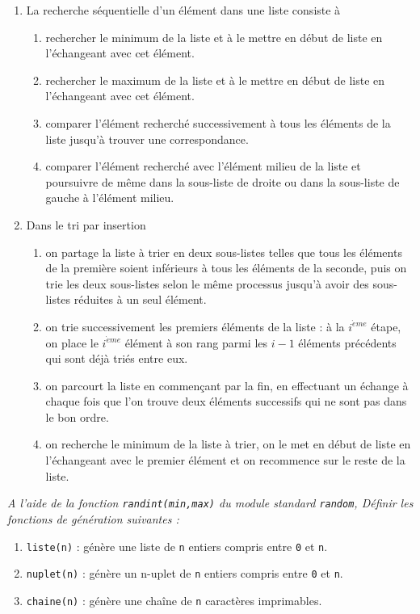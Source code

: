 \begin{td}[QCM (4)]
\begin{enumerate}
\item La recherche séquentielle d'un élément dans une liste consiste à 
	\begin{enumerate}
	\item rechercher le minimum de la liste et à le mettre en début de liste 
		en l'échangeant avec cet élément.
	\item rechercher le maximum de la liste et à le mettre en début de liste 
		en l'échangeant avec cet élément.
	\item comparer l'élément recherché successivement à tous les 
		éléments de la liste jusqu'à trouver une correspondance.
	\item comparer l'élément recherché avec l'élément milieu de la liste
		et poursuivre de même dans la sous-liste de droite ou 
		dans la sous-liste de gauche à l'élément milieu.
	\end{enumerate}

\item Dans le tri par insertion 
	\begin{enumerate}
	\item on partage la liste à trier en deux sous-listes telles que tous les éléments 
		de la première soient inférieurs à tous les éléments de la seconde,
		puis on trie les deux sous-listes selon le même processus jusqu'à 
		avoir des sous-listes réduites à un seul élément.
	\item on trie successivement les premiers éléments de la liste : à la $i^{\grave eme}$ étape, 
		on place le $i^{\grave eme}$ élément à son rang 
		parmi les $i-1$ éléments précédents qui sont déjà triés entre eux.
	\item on parcourt la liste en commençant par la fin, en effectuant un échange à
		chaque fois que l'on trouve deux éléments successifs qui ne sont pas 
		dans le bon ordre.
	\item on recherche le minimum de la liste à trier, on le met en début de liste 
		en l'échangeant avec le premier élément et on recommence sur le reste de la liste.
	\end{enumerate}

\end{enumerate}
\end{td}

\begin{td}\label{td:alea}
\em
A l'aide de la fonction {\tt randint(min,max)} du module standard {\tt random},
Définir les fonctions de génération suivantes :
\begin{enumerate}
\item {\tt liste(n)} : génère une liste de {\tt n} entiers compris entre {\tt 0} et {\tt n}.
\item {\tt nuplet(n)} : génère un n-uplet de {\tt n} entiers compris entre {\tt 0} et {\tt n}.
\item {\tt chaine(n)} : génère une chaîne de {\tt n} caractères imprimables.
\end{enumerate}
\end{td}

